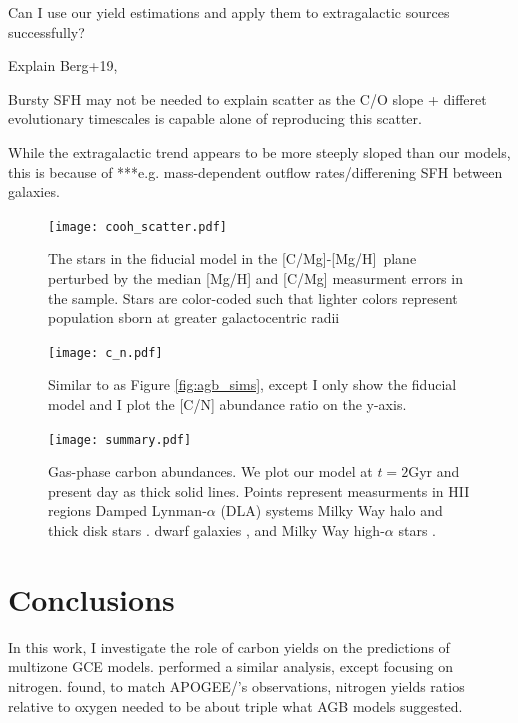 \documentclass[12pt,oneside]{report}
\newcommand{\caah}{[C/Mg]-[Mg/H]}
\begin{document}
Can I use our yield estimations and apply them to extragalactic sources successfully? 

Explain Berg+19,

Bursty SFH may not be needed to explain scatter as the C/O slope + differet evolutionary timescales is capable alone of reproducing this scatter.

While the extragalactic trend appears to be more steeply sloped than our models, this is because of ***e.g. mass-dependent outflow rates/differening SFH between galaxies. 

\begin{figure}
    \centering
    \texttt{[image: cooh\_scatter.pdf]}
    \caption[Scatter agreement]{The stars in the fiducial model in the \caah~plane perturbed by the median [Mg/H] and [C/Mg] measurment errors in the \citet{jack_subgiant} sample. Stars are color-coded such that lighter colors represent population sborn at greater galactocentric radii
    }
\end{figure}

\begin{figure}
    \texttt{[image: c\_n.pdf]}
    \caption{Similar to as Figure \ref{fig:agb_sims}, except I only show the fiducial model and I plot the [C/N] abundance ratio on the y-axis.
    }
\end{figure}

\begin{figure}
\centering
\texttt{[image: summary.pdf]}
\caption[Gas phase abundances]{Gas-phase carbon abundances. We plot our model at $t=2$Gyr and present day as thick solid lines. Points represent measurments in 
    HII regions    \citep[pink circles;][]{skillman+20, esteban+02, esteban+09, esteban+14, esteban+19}
    Damped Lynman-$\alpha$ (DLA) systems \citep[blue triangles;][]{cooke+17} 
    Milky Way halo and thick disk stars \citep[green stars;][]{nissen+14, fabbian+09}. 
    dwarf galaxies \citep[red diamonds;]{berg+19},
    and Milky Way high-$\alpha$ stars \citet[yellow points;][]{jack_subgiant}.
}
\label{fig:gas_phase}
\end{figure}


\chapter{Conclusions}

In this work, I investigate the role of carbon yields on the predictions of multizone GCE models. \citet{james+22} performed a similar analysis, except focusing on nitrogen. \citet{james+22} found, to match APOGEE/\citet{fiorenzo+21}'s observations, nitrogen yields ratios relative to oxygen needed to be about triple what AGB models suggested.
\end{document}
